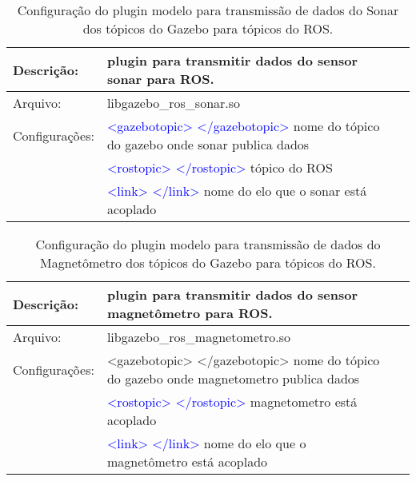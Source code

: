 			\begin{table}[h]
			\centering
			\begin{tabular}{|r|lr|}
			\hline
			\multicolumn{1}{|l|}{Descrição: } & plugin para transmitir dados do sensor sonar para ROS. &       \\
			\hline
			\multicolumn{1}{|l|}{Arquivo: } & libgazebo\_ros\_sonar.so &            \\
			\hline
			\multicolumn{1}{|l|}{Configurações: } & \textcolor{blue}{<gazebotopic> </gazebotopic>} nome do tópico do gazebo onde sonar publica dados &           \\
			& \textcolor{blue}{<rostopic> </rostopic>} tópico do ROS &           \\
			& \textcolor{blue}{<link> </link>} nome do elo que o sonar está acoplado &     \\
			\hline
			\end{tabular}%
			\caption{Configuração do plugin modelo para transmissão de dados do Sonar dos tópicos do Gazebo para tópicos do ROS.}
			\label{tab:Sonar}%
			\end{table}%
			
			\begin{table}[h]
			\centering
			\begin{tabular}{|r|lr|}
			\hline
			\multicolumn{1}{|l|}{Descrição: } & plugin para transmitir dados do sensor magnetômetro para ROS. &                \\
			\hline
			\multicolumn{1}{|l|}{Arquivo: } & libgazebo\_ros\_magnetometro.so &                    \\
			\hline
			\multicolumn{1}{|l|}{Configurações: } & <gazebotopic> </gazebotopic> nome do tópico do gazebo onde magnetometro publica dados &             \\
			& \textcolor{blue}{<rostopic> </rostopic>} magnetometro está acoplado &                    \\
			& \textcolor{blue}{<link> </link>} nome do elo que o magnetômetro está acoplado &                   \\
			\hline
			\end{tabular}%
			\caption{Configuração do plugin modelo para transmissão de dados do Magnetômetro dos tópicos do Gazebo para tópicos do ROS.}
			\label{tab:magnetometro}%
			\end{table}%